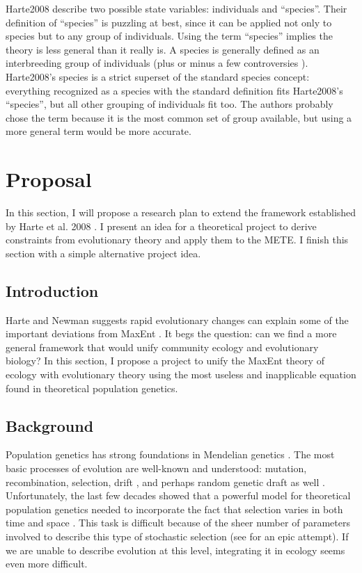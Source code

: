 \documentclass[letterpaper,12pt]{article}
\begin{document}
Harte2008 describe two possible state variables: individuals and
``species''. Their definition of ``species'' is puzzling at best, since it
can be applied not only to species but to any group of individuals. Using
the term ``species'' implies the theory is less general than it really is. A
species is generally defined as an interbreeding group of individuals (plus
or minus a few controversies \cite{coy04}). Harte2008's species is a strict
superset of the standard species concept: everything recognized as a
species with the standard definition fits Harte2008's ``species'', but all
other grouping of individuals fit too. The authors probably chose the term
because it is the most common set of group available, but using a more general
term would be more accurate.

\newpage
\section{Proposal}\label{proposal}

In this section, I will propose a research plan to extend the framework
established by Harte et al. 2008 \cite{har08}. I present an idea for a
theoretical project to derive constraints from evolutionary theory and apply
them to the METE. I finish this section with a simple alternative project
idea.

\subsection{Introduction}

Harte and Newman \cite{har14} suggests rapid evolutionary changes can
explain some of the important deviations from MaxEnt \cite{har14}. It begs
the question: can we find a more general framework that would unify
community ecology and evolutionary biology? In this section, I propose a
project to unify the MaxEnt theory of ecology with evolutionary theory using
the most useless and inapplicable equation found in theoretical population
genetics.

\subsection{Background}

Population genetics has strong foundations in Mendelian genetics \cite
{cha11b}. The most basic processes of evolution are well-known and
understood: mutation, recombination, selection, drift \cite
{cro70,lyn07,gil04b,gil04b}, and perhaps random genetic draft as well \cite
{gil01}. Unfortunately, the last few decades showed that a powerful model
for theoretical population genetics needed to incorporate the fact that
selection varies in both time and space \cite
{gil01,beg07,bel08,bel09,bel10}. This task is difficult because of the sheer
number of parameters involved to describe this type of stochastic selection
\cite {hah08,wak05} (see \cite{gil04} for an epic attempt). If we are unable
to describe evolution at this level, integrating it in ecology seems even
more difficult.
\end{document}

